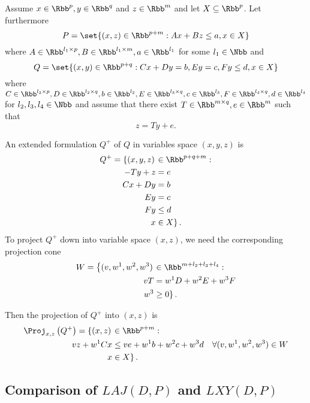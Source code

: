 Assume $x\in \Rbb^p, y\in\Rbb^q$ and $z\in\Rbb^m$ and let $X\subseteq \Rbb^p$. Let furthermore 
\begin{equation*}
	P = \set{(x,z)\in\Rbb^{p+m}: Ax + Bz \leq a, x\in X}
\end{equation*}
where $A\in\Rbb^{l_1\times p}, B\in\Rbb^{l_1\times m}, a\in\Rbb^{l_1}$ for some $l_1 \in\Nbb$ and 
\begin{equation*}
	Q = \set{(x,y)\in\Rbb^{p+q}: Cx + Dy = b, Ey = c, Fy \leq d, x\in X}
\end{equation*}
where $C\in\Rbb^{l_2\times p}, D\in\Rbb^{l_2\times q}, b\in\Rbb^{l_2}, E\in\Rbb^{l_3\times q}, c\in\Rbb^{l_3}, F\in\Rbb^{l_4\times q}, d\in\Rbb^{l_4}$ for $l_2,l_3,l_4\in\Nbb$ and assume that there exist $T\in \Rbb^{m\times q}, e\in\Rbb^m$ such that
\begin{equation*}
	z = Ty + e.
\end{equation*}

An extended formulation $Q^+$ of $Q$ in variables space $(x, y, z)$ is
\begin{align*}
	Q^+ = \left\{(x,y,z)\right.&\in\Rbb^{p+q+m}:\\
	-Ty + z&= e\\
	Cx + Dy&= b\\
	Ey&= c\\
	Fy&\leq d\\
	x&\left.\in X\right\}.
\end{align*}
To project $Q^+$ down into variable space $(x,z)$, we need the corresponding projection cone
\begin{align*}
	W = \left\{(v, w^1, w^2, w^3)\right.&\in\Rbb^{m+l_2+l_3+l_4}:\\
	vT&=w^1D + w^2 E + w^3 F\\
	w^3&\left.\geq 0\right\}.
\end{align*}

Then the projection of $Q^+$ into $(x,z)$ is 
\begin{align*}
	\Proj_{x,z}\left(Q^+\right) = \left\{(x,z)\right.&\in\Rbb^{p+m}:\\
	vz + w^1Cx&\leq ve + w^1b + w^2 c + w^3 d \quad\forall (v,w^1,w^2,w^3)\in W\\
	x&\left.\in X\right\}.
\end{align*}

\subsection{Comparison of $LAJ(D,P)$ and $LXY(D,P)$}

